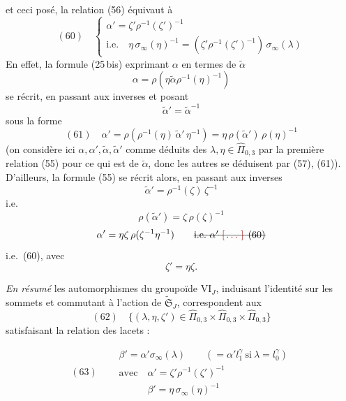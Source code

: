 \documentclass[11pt,a4paper]{article}
\begin{document}
et ceci posé, la relation (56) équivaut à
\[
(60)\quad
\begin{cases}
\alpha' = \zeta' \rho^{-1}(\zeta')^{-1} \\
\text{i.e.}\quad \eta\, \sigma_\infty(\eta)^{-1} = (\zeta' \rho^{-1}(\zeta')^{-1})\, \sigma_\infty(\lambda)
\end{cases}
\]
En effet, la formule (25\,bis) exprimant $\alpha$ en termes de $\tilde\alpha$
\[
\alpha = \rho(\eta \tilde\alpha \rho^{-1}(\eta)^{-1})
\]
se récrit, en passant aux inverses et posant
\[
\tilde\alpha' = \tilde\alpha^{-1}
\]
sous la forme
\[
(61)\quad \alpha' = \rho(\rho^{-1}(\eta)\, \tilde\alpha'\, \eta^{-1}) = \eta\, \rho(\tilde\alpha')\, \rho(\eta)^{-1}
\]
 (on considère ici $\alpha, \alpha', \tilde\alpha, \tilde\alpha'$ comme déduits des $\lambda, \eta \in \widehat{\Pi}_{0,3}$ par la première relation (55) pour ce qui est de $\tilde\alpha$, donc les autres se déduisent par (57), (61)). D'ailleurs, la  formule (55)  se récrit alors, en passant aux inverses
\[
\tilde\alpha' = \rho^{-1}(\zeta)\, \zeta^{-1}
\]
i.e.
\[
\rho(\tilde\alpha') = \zeta\, \rho(\zeta)^{-1}
\]
\[
\alpha' = \eta\zeta\, \rho(\zeta^{-1}\eta^{-1}) \qquad \text{\struck{i.e.\ $\alpha'$ \ill{} (60)}}
\]
i.e.\ (60), avec
\[
\zeta' = \eta\zeta.
\]

\emph{En résumé} les automorphismes du groupoïde $\mathrm{VI}_J$, induisant l'identité sur les sommets et commutant à l'action de $\widetilde{\mathfrak{S}}_J$, correspondent aux
\[
(62)\quad \{(\lambda, \eta, \zeta') \in \widehat{\Pi}_{0,3} \times \widehat{\Pi}_{0,3} \times \widehat{\Pi}_{0,3}\}
\]
satisfaisant la relation des lacets :

\[
(63)\quad
\boxed{
\begin{aligned}
&\beta' = \alpha' \sigma_\infty(\lambda) \qquad (= \alpha' l_1^{\gamma} \ \text{si}\ \lambda = l_0^{\gamma}) \\
&\text{avec}\quad \alpha' = \zeta' \rho^{-1}(\zeta')^{-1} \\
&\phantom{\text{avec}\quad} \beta' = \eta\, \sigma_\infty(\eta)^{-1}
\end{aligned}
}
\]
\end{document}
